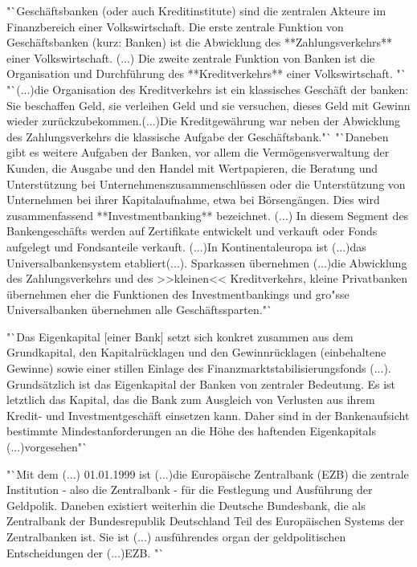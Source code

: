\documentclass[
        onecolumn,
        a4paper,
        abstracton,
        parskip=half
        ,final
        ]{scrartcl}
\begin{document}
    \citep[vgl.][S.512-13]{Basseler2010} "`Gesch{\"a}ftsbanken (oder auch Kreditinstitute) sind die zentralen Akteure im Finanzbereich einer Volkswirtschaft. Die erste zentrale Funktion von Gesch{\"a}ftsbanken (kurz: Banken) ist die Abwicklung des **Zahlungsverkehrs** einer Volkswirtschaft. (...) Die zweite zentrale Funktion von Banken ist die Organisation und Durchf{\"u}hrung des **Kreditverkehrs** einer Volkswirtschaft. "`
    "`(...)die Organisation des Kreditverkehrs ist ein klassisches Gesch{\"a}ft der banken: Sie beschaffen Geld, sie verleihen Geld und sie versuchen, dieses Geld mit Gewinn wieder zur{\"u}ckzubekommen.(...)Die Kreditgew{\"a}hrung war neben der Abwicklung des Zahlungsverkehrs die klassische Aufgabe der Gesch{\"a}ftsbank."`
     "`Daneben gibt es weitere Aufgaben der Banken, vor allem die Verm{\"o}gensverwaltung der Kunden, die Ausgabe und den Handel mit Wertpapieren, die Beratung und Unterst{\"u}tzung bei Unternehmenszusammenschl{\"u}ssen oder die Unterst{\"u}tzung von Unternehmen bei ihrer Kapitalaufnahme, etwa bei B{\"o}rseng{\"a}ngen. Dies wird zusammenfassend **Investmentbanking** bezeichnet. (...) In diesem Segment des Bankengesch{\"a}fts  werden auf Zertifikate entwickelt und verkauft oder Fonds aufgelegt und Fondsanteile verkauft. (...)In Kontinentaleuropa ist (...)das Universalbankensystem etabliert(...). Sparkassen {\"u}bernehmen (...)die Abwicklung des Zahlungsverkehrs und des >>kleinen<< Kreditverkehrs, kleine Privatbanken {\"u}bernehmen eher die Funktionen des Investmentbankings und gro{"ss}e Universalbanken {\"u}bernehmen alle Gesch{\"a}ftssparten."`

    \citep[vgl.][S.515]{Basseler2010} "`Das Eigenkapital [einer Bank] setzt sich konkret zusammen aus dem Grundkapital, den Kapitalr{\"u}cklagen und den Gewinnr{\"u}cklagen (einbehaltene Gewinne) sowie einer stillen Einlage des Finanzmarktstabilisierungsfonds (...). Grunds{\"a}tzlich ist das Eigenkapital der Banken von zentraler Bedeutung. Es ist letztlich das Kapital, das die Bank zum Ausgleich von Verlusten aus ihrem Kredit- und Investmentgesch{\"a}ft einsetzen kann.  Daher sind in der Bankenaufsicht bestimmte Mindestanforderungen an die H{\"o}he des haftenden Eigenkapitals (...)vorgesehen"`

    \citep[vgl.][S.512]{Basseler2010}  "`Mit dem (...) 01.01.1999 ist (...)die Europ{\"a}ische Zentralbank (EZB) die zentrale Institution - also die Zentralbank - f{\"u}r die Festlegung und Ausf{\"u}hrung der Geldpolik. Daneben existiert weiterhin die Deutsche Bundesbank, die als Zentralbank der Bundesrepublik Deutschland Teil des Europ{\"a}ischen Systems der Zentralbanken ist. Sie ist (...) ausf{\"u}hrendes organ der geldpolitischen Entscheidungen der (...)EZB. "`
    \clearpage
\end{document}
